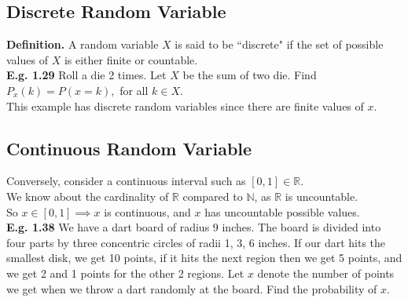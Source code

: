 \documentclass[12pt]{book}
\begin{document}
\subsection{Discrete Random Variable}
\textbf{Definition.} A random variable $X$ is said to be ``discrete" if the set of possible values of $X$ is either finite or countable. \\

\noindent \textbf{E.g. 1.29} Roll a die 2 times. Let $X$ be the sum of two die. Find $P_x(k)=P(x=k),$ for all $k \in X$.\\
This example has discrete random variables since there are finite values of $x$.\\

\subsection{Continuous Random Variable}
Conversely, consider a continuous interval such as $[0,1]\in \mathbb{R}$.\\
We know about the cardinality of $\mathbb{R}$ compared to $\mathbb{N}$, as $\mathbb{R}$ is uncountable.\\
So $x\in [0,1]\implies x$ is continuous, and $x$ has uncountable possible values.\\

\noindent \textbf{E.g. 1.38} We have a dart board of radius 9 inches. The board is divided into four parts by three concentric circles of radii 1, 3, 6 inches. If our dart hits the smallest disk, we get 10 points, if it hits the next region then we get 5 points, and we get 2 and 1 points for the other 2 regions. Let $x$ denote the number of points we get when we throw a dart randomly at the board. Find the probability of $x$.\\
\end{document}
